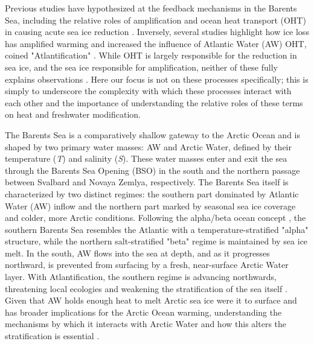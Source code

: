 \documentclass[draft]{agujournal2019}
\begin{document}
Previous studies have hypothesized at the feedback mechanisms in the Barents Sea, including the relative roles of amplification \cite{Stroeve2018,Previdi2021} and ocean heat transport (OHT) in causing acute sea ice reduction \cite{Arthun2012}. Inversely, several studies highlight how ice loss has amplified warming \cite{Screen2010} and increased the influence of Atlantic Water (AW) OHT, coined "Atlantification" \cite{Polyakov2017,Arthun2019}. While OHT is largely responsible for the reduction in sea ice, and the sea ice responsible for amplification, neither of these fully explains observations \cite{Screen2010,Smedsrud2013,Pithan2014,Li2017}. Here our focus is not on these processes specifically; this is simply to underscore the complexity with which these processes interact with each other and the importance of understanding the relative roles of these terms on heat and freshwater modification.


The Barents Sea is a comparatively shallow gateway to the Arctic Ocean and is shaped by two primary water masses: AW and Arctic Water, defined by their temperature (\emph{T}) and salinity (\emph{S}). These water masses enter and exit the sea through the Barents Sea Opening (BSO) in the south and the northern passage between Svalbard and Novaya Zemlya, respectively. The Barents Sea itself is characterized by two distinct regimes: the southern part dominated by Atlantic Water (AW) inflow \cite{Hakkinen2009} and the northern part marked by seasonal sea ice coverage and colder, more Arctic conditions. Following the alpha/beta ocean concept \cite{Nansen1902,Carmack2007,Stewart2016}, the southern Barents Sea resembles the Atlantic with a temperature-stratified "alpha" structure, while the northern salt-stratified "beta" regime is maintained by sea ice melt. In the south, AW flows into the sea at depth, and as it progresses northward, is prevented from surfacing by a fresh, near-surface Arctic Water layer. With Atlantification, the southern regime is advancing northwards, threatening local ecologies \cite{Bogstad2015,Dalpadado2014,Ingvaldsen2021} and weakening the stratification of the sea itself \cite{Lind2018}. Given that AW holds enough heat to melt Arctic sea ice were it to surface and has broader implications for the Arctic Ocean warming, understanding the mechanisms by which it interacts with Arctic Water and how this alters the stratification is essential \cite{Polyakov2017,Stroeve2018,Skagseth2020,Grabon2021}.
\end{document}
